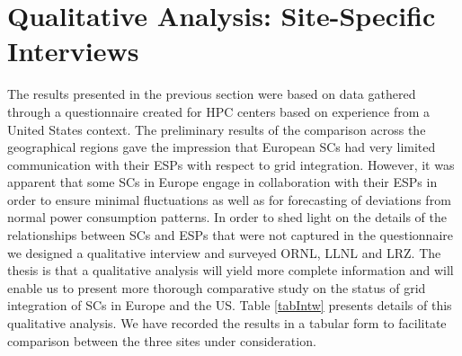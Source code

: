 \section{Qualitative Analysis: Site-Specific Interviews}

The results presented in the previous section were based on data gathered through a questionnaire created for HPC centers based on experience from a United States context. The preliminary results of the comparison across the geographical regions gave the impression that European SCs had very limited communication with their ESPs with respect to grid integration. 
However, it was apparent that some SCs in Europe engage in collaboration with their ESPs in order to ensure minimal fluctuations as well as for forecasting of deviations from normal power consumption patterns. 
In order to shed light on the details of the relationships between SCs and ESPs that were not captured in the questionnaire we designed a qualitative interview and surveyed ORNL, LLNL and LRZ. The thesis is that a qualitative analysis will yield more complete information and will enable us to present more thorough comparative study on the status of grid integration of SCs in Europe and the US. Table \ref{tabIntw} presents details of this qualitative analysis. We have recorded the results in a tabular form to facilitate comparison between the three sites under consideration. 

